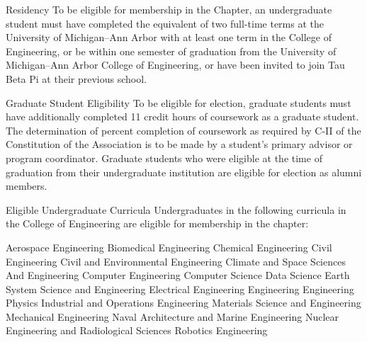 \begin{enumsubsection}
\item{Residency}
To be eligible for membership in the Chapter, an undergraduate student must have completed the equivalent of two full-time terms at the University of Michigan--Ann Arbor with at least one term in the College of Engineering, or be within one semester of graduation from the University of Michigan--Ann Arbor College of Engineering, or have been invited to join Tau Beta Pi at their previous school.
\item{Graduate Student Eligibility}\label{sec:grad_elig}
To be eligible for election, graduate students must have additionally completed 11 credit hours of coursework as a graduate student.
The determination of percent completion of coursework as required by C-II of the Constitution of the Association is to be made by a student's primary advisor or program coordinator.
Graduate students who were eligible at the time of graduation from their undergraduate institution are eligible for election as alumni members.
\item{Eligible Undergraduate Curricula}\label{sec:ugrad_cur}
Undergraduates in the following curricula in the College of Engineering are eligible for membership in the chapter:

\let\oldenumi\labelenumii
\renewcommand{\labelenumii}{\arabic{enumii}.}
\begin{enumsubsubsection}

\itemnotoc Aerospace Engineering
\itemnotoc Biomedical Engineering
\itemnotoc Chemical Engineering
\itemnotoc Civil Engineering
\itemnotoc Civil and Environmental Engineering
\itemnotoc Climate and Space Sciences And Engineering
\itemnotoc Computer Engineering
\itemnotoc Computer Science
\itemnotoc Data Science
\itemnotoc Earth System Science and Engineering
\itemnotoc Electrical Engineering
\itemnotoc Engineering
\itemnotoc Engineering Physics
\itemnotoc Industrial and Operations Engineering
\itemnotoc Materials Science and Engineering
\itemnotoc Mechanical Engineering
\itemnotoc Naval Architecture and Marine Engineering
\itemnotoc Nuclear Engineering and Radiological Sciences
\itemnotoc Robotics Engineering


\end{enumsubsubsection}
\end{enumsubsection}
